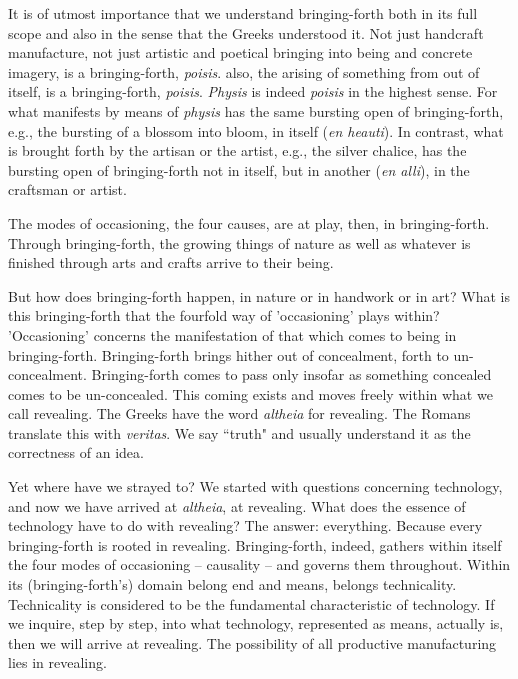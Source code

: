 \documentclass[12pt]{article}
\begin{document}
It is of utmost importance that we understand bringing-forth both in its full scope and also in the sense that the Greeks understood it. Not just handcraft manufacture, not just artistic and poetical bringing into being and concrete imagery, is a bringing-forth, \textit{poisis}.  also, the arising of something from out of itself, is a bringing-forth, \textit{poisis}. \textit{Physis} is indeed \textit{poisis} in the highest sense. For what manifests by means of \textit{physis} has the same bursting open of bringing-forth, e.g., the bursting of a blossom into bloom, in itself (\textit{en heauti}). In contrast, what is brought forth by the artisan or the artist, e.g., the silver chalice, has the bursting open of bringing-forth not in itself, but in another (\textit{en alli}), in the craftsman or artist.

The modes of occasioning, the four causes, are at play, then, in bringing-forth. Through bringing-forth, the growing things of nature as well as whatever is finished through arts and crafts arrive to their being.

But how does bringing-forth happen, in nature or in handwork or in art? What is this bringing-forth that the fourfold way of 'occasioning' plays within? 'Occasioning' concerns the manifestation of that which comes to being in bringing-forth. Bringing-forth brings hither out of concealment, forth to un-concealment. Bringing-forth comes to pass only insofar as something concealed comes to be un-concealed. This coming exists and moves freely within what we call revealing. The Greeks have the word \textit{altheia} for revealing. The Romans translate this with \textit{veritas}. We say ``truth" and usually understand it as the correctness of an idea.



Yet where have we strayed to? We started with questions concerning technology, and now we have arrived at \textit{altheia}, at revealing. What does the essence of technology have to do with revealing? The answer: everything. Because every bringing-forth is rooted in revealing. Bringing-forth, indeed, gathers within itself the four modes of occasioning -- causality -- and governs them throughout. Within its (bringing-forth's) domain belong end and means, belongs technicality. Technicality is considered to be the fundamental characteristic of technology. If we inquire, step by step, into what technology, represented as means, actually is, then we will arrive at revealing. The possibility of all productive manufacturing lies in revealing.
\end{document}
